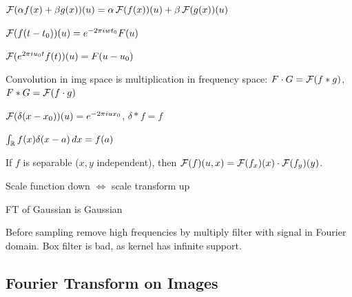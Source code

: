 \begin{definition}[Lin.]
  \(\operatorname{\mathcal{F}}(\alpha f(x) + \beta g(x))(u) = \alpha \operatorname{\mathcal{F}}(f(x))(u) + \beta \operatorname{\mathcal{F}}(g(x))(u)\)
\end{definition}

\begin{definition}
  \(\operatorname{\mathcal{F}}(f(t - t_0))(u) = e^{-2 \pi iwt_0 } F(u)\)
\end{definition}

\begin{definition}
  \(\operatorname{\mathcal{F}}(e^{2 \pi iu_0t}f(t))(u) = F(u - u_0)\)
\end{definition}

\begin{algorithm}
  Convolution in img space is multiplication in frequency space: \(F \cdot G = \operatorname{\mathcal{F}}(f \ast g)\), \(F \ast G = \operatorname{\mathcal{F}}(f \cdot g)\)
\end{algorithm}

\begin{definition}
  \(\operatorname{\mathcal{F}}(\delta(x - x_0))(u) = e^{-2\pi i u x_0}\), \(\delta \ast f = f\)
\end{definition}

\begin{definition}
  \(\int_{\operatorname{\mathbb{R}}} f(x)\delta(x - a) \,dx = f(a)\)
\end{definition}

\begin{definition}
  If \(f\) is separable (\(x, y\) independent), then \(\operatorname{\mathcal{F}}(f)(u, x) = \operatorname{\mathcal{F}}(f_x)(x) \cdot \operatorname{\mathcal{F}}(f_y)(y)\).
\end{definition}

\begin{definition}
  Scale function down \(\iff\) scale transform up
\end{definition}

\begin{definition}[Gaussian]
  FT of Gaussian is Gaussian
\end{definition}

\begin{definition}[Smoothing]
  Before sampling remove high frequencies by multiply filter with signal in Fourier domain.
  Box filter is bad, as kernel has infinite support.
\end{definition}

\subsection{Fourier Transform on Images}

